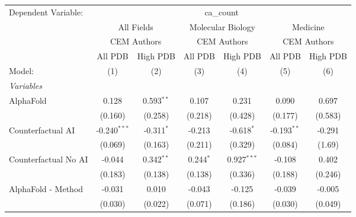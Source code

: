 \begingroup
\centering
\begin{tabular}{lcccccc}
   \tabularnewline \midrule \midrule
   Dependent Variable: & \multicolumn{6}{c}{ca\_count}\\
 & \multicolumn{2}{c}{All Fields} & \multicolumn{2}{c}{Molecular Biology} & \multicolumn{2}{c}{Medicine} \\
\cmidrule(lr){2-3} \cmidrule(lr){4-5} \cmidrule(lr){6-7}
 & \multicolumn{2}{c}{CEM Authors} & \multicolumn{2}{c}{CEM Authors} & \multicolumn{2}{c}{CEM Authors} \\
\cmidrule(lr){2-3} \cmidrule(lr){4-5} \cmidrule(lr){6-7}
 & \multicolumn{1}{c}{All PDB} & \multicolumn{1}{c}{High PDB} & \multicolumn{1}{c}{All PDB} & \multicolumn{1}{c}{High PDB} & \multicolumn{1}{c}{All PDB} & \multicolumn{1}{c}{High PDB} \\
\cmidrule(lr){2-2} \cmidrule(lr){3-3} \cmidrule(lr){4-4} \cmidrule(lr){5-5} \cmidrule(lr){6-6} \cmidrule(lr){7-7}
   Model:                                                     & (1)            & (2)          & (3)         & (4)           & (5)           & (6)\\  
   \midrule
   \emph{Variables}\\
   AlphaFold                                                  & 0.128          & 0.593$^{**}$ & 0.107       & 0.231         & 0.090         & 0.697\\   
                                                              & (0.160)        & (0.258)      & (0.218)     & (0.428)       & (0.177)       & (0.583)\\   
   Counterfactual AI                                          & -0.240$^{***}$ & -0.311$^{*}$ & -0.213      & -0.618$^{*}$  & -0.193$^{**}$ & -0.291\\   
                                                              & (0.069)        & (0.163)      & (0.211)     & (0.329)       & (0.084)       & (1.69)\\   
   Counterfactual No AI                                       & -0.044         & 0.342$^{**}$ & 0.244$^{*}$ & 0.927$^{***}$ & -0.108        & 0.402\\   
                                                              & (0.183)        & (0.138)      & (0.138)     & (0.336)       & (0.188)       & (0.246)\\   
   AlphaFold - Method                                         & -0.031         & 0.010        & -0.043      & -0.125        & -0.039        & -0.005\\   
                                                              & (0.030)        & (0.022)      & (0.071)     & (0.186)       & (0.030)       & (0.049)\\   

\end{tabular}
